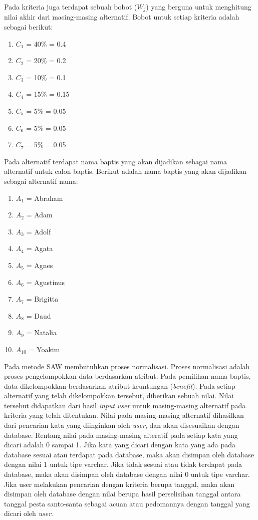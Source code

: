 \documentclass[a4paper,twoside]{article}
\begin{document}
\begin{enumerate}
Pada kriteria juga terdapat sebuah bobot ($W_{j}$) yang berguna untuk menghitung nilai akhir dari masing-masing alternatif. Bobot untuk setiap kriteria adalah sebagai berikut:

\begin{enumerate}
	\item $C_{1}$ = 40\% = 0.4
	\item $C_{2}$ = 20\% = 0.2
	\item $C_{3}$ = 10\% = 0.1
	\item $C_{4}$ = 15\% = 0.15
	\item $C_{5}$ = 5\% = 0.05
	\item $C_{6}$ = 5\% = 0.05
	\item $C_{7}$ = 5\% = 0.05
\end{enumerate}

Pada alternatif terdapat nama baptis yang akan dijadikan sebagai nama alternatif untuk calon baptis. Berikut adalah nama baptis yang akan dijadikan sebagai alternatif nama:

\begin{enumerate}
	\item $A_{1}$ = Abraham
	\item $A_{2}$ = Adam
	\item $A_{3}$ = Adolf
	\item $A_{4}$ = Agata
	\item $A_{5}$ = Agnes
	\item $A_{6}$ = Agustinus
	\item $A_{7}$ = Brigitta
	\item $A_{8}$ = Daud
	\item $A_{9}$ = Natalia
	\item $A_{10}$ = Yoakim
\end{enumerate}

Pada metode SAW membutuhkan proses normalisasi. Proses normalisasi adalah proses pengelompokkan data berdasarkan atribut. Pada pemilihan nama baptis, data dikelompokkan berdasarkan atribut keuntungan (\textit{benefit}). Pada setiap alternatif yang telah dikelompokkan tersebut,
diberikan sebuah nilai. Nilai tersebut didapatkan dari hasil \textit{input} \textit{user} untuk masing-masing alternatif pada
kriteria yang telah ditentukan. %
Nilai pada masing-masing alternatif dihasilkan dari pencarian kata yang diinginkan oleh \textit{user}, dan akan disesuaikan dengan database. Rentang nilai pada masing-masing alteratif pada setiap kata yang dicari adalah 0 sampai 1. Jika kata yang dicari dengan kata yang ada pada database sesuai atau terdapat pada database, maka akan disimpan oleh database dengan nilai 1 untuk tipe varchar. Jika tidak sesuai atau tidak terdapat pada database, maka akan disimpan oleh database dengan nilai 0 untuk tipe varchar. Jika user melakukan pencarian dengan kriteria berupa tanggal, maka akan disimpan oleh database dengan nilai berupa hasil perselisihan tanggal antara tanggal pesta santo-santa sebagai acuan atau pedomannya dengan tanggal yang dicari oleh \textit{user}. 


\end{enumerate}
\end{document}
